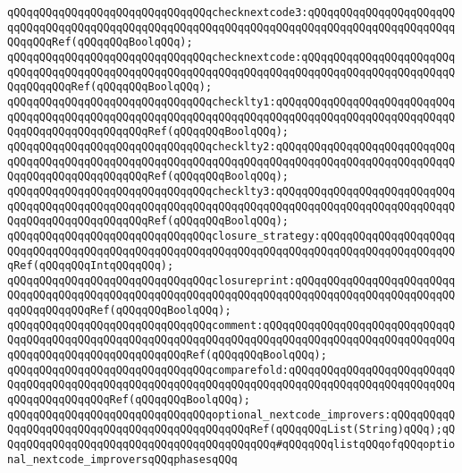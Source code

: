 \verb|qQQqqQQqqQQqqQQqqQQqqQQqqQQqqQQqchecknextcode3:qQQqqQQqqQQqqQQqqQQqqQQqqQQqqQQqqQQqqQQqqQQqqQQqqQQqqQQqqQQqqQQqqQQqqQQqqQQqqQQqqQQqqQQqqQQqqQQqqQQqRef(qQQqqQQqBoolqQQq);|\newline
\verb|qQQqqQQqqQQqqQQqqQQqqQQqqQQqqQQqchecknextcode:qQQqqQQqqQQqqQQqqQQqqQQqqQQqqQQqqQQqqQQqqQQqqQQqqQQqqQQqqQQqqQQqqQQqqQQqqQQqqQQqqQQqqQQqqQQqqQQqqQQqqQQqRef(qQQqqQQqBoolqQQq);|\newline
\verb|qQQqqQQqqQQqqQQqqQQqqQQqqQQqqQQqchecklty1:qQQqqQQqqQQqqQQqqQQqqQQqqQQqqQQqqQQqqQQqqQQqqQQqqQQqqQQqqQQqqQQqqQQqqQQqqQQqqQQqqQQqqQQqqQQqqQQqqQQqqQQqqQQqqQQqqQQqqQQqRef(qQQqqQQqBoolqQQq);|\newline
\verb|qQQqqQQqqQQqqQQqqQQqqQQqqQQqqQQqchecklty2:qQQqqQQqqQQqqQQqqQQqqQQqqQQqqQQqqQQqqQQqqQQqqQQqqQQqqQQqqQQqqQQqqQQqqQQqqQQqqQQqqQQqqQQqqQQqqQQqqQQqqQQqqQQqqQQqqQQqqQQqRef(qQQqqQQqBoolqQQq);|\newline
\verb|qQQqqQQqqQQqqQQqqQQqqQQqqQQqqQQqchecklty3:qQQqqQQqqQQqqQQqqQQqqQQqqQQqqQQqqQQqqQQqqQQqqQQqqQQqqQQqqQQqqQQqqQQqqQQqqQQqqQQqqQQqqQQqqQQqqQQqqQQqqQQqqQQqqQQqqQQqqQQqRef(qQQqqQQqBoolqQQq);|\newline
\newline
\verb|qQQqqQQqqQQqqQQqqQQqqQQqqQQqqQQqclosure_strategy:qQQqqQQqqQQqqQQqqQQqqQQqqQQqqQQqqQQqqQQqqQQqqQQqqQQqqQQqqQQqqQQqqQQqqQQqqQQqqQQqqQQqqQQqqQQqRef(qQQqqQQqIntqQQqqQQq);|\newline
\newline
\verb|qQQqqQQqqQQqqQQqqQQqqQQqqQQqqQQqclosureprint:qQQqqQQqqQQqqQQqqQQqqQQqqQQqqQQqqQQqqQQqqQQqqQQqqQQqqQQqqQQqqQQqqQQqqQQqqQQqqQQqqQQqqQQqqQQqqQQqqQQqqQQqqQQqRef(qQQqqQQqBoolqQQq);|\newline
\verb|qQQqqQQqqQQqqQQqqQQqqQQqqQQqqQQqcomment:qQQqqQQqqQQqqQQqqQQqqQQqqQQqqQQqqQQqqQQqqQQqqQQqqQQqqQQqqQQqqQQqqQQqqQQqqQQqqQQqqQQqqQQqqQQqqQQqqQQqqQQqqQQqqQQqqQQqqQQqqQQqqQQqRef(qQQqqQQqBoolqQQq);|\newline
\verb|qQQqqQQqqQQqqQQqqQQqqQQqqQQqqQQqcomparefold:qQQqqQQqqQQqqQQqqQQqqQQqqQQqqQQqqQQqqQQqqQQqqQQqqQQqqQQqqQQqqQQqqQQqqQQqqQQqqQQqqQQqqQQqqQQqqQQqqQQqqQQqqQQqqQQqRef(qQQqqQQqBoolqQQq);|\newline
\newline
\verb|qQQqqQQqqQQqqQQqqQQqqQQqqQQqqQQqoptional_nextcode_improvers:qQQqqQQqqQQqqQQqqQQqqQQqqQQqqQQqqQQqqQQqqQQqqQQqRef(qQQqqQQqList(String)qQQq);qQQqqQQqqQQqqQQqqQQqqQQqqQQqqQQqqQQqqQQqqQQq#qQQqqQQqlistqQQqofqQQqoptional_nextcode_improversqQQqphasesqQQq|\newline
\newline
